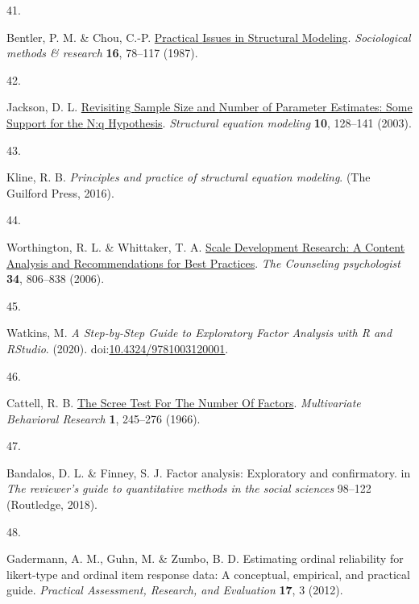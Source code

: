 \documentclass[
  man]{apa6}
\newlength{\cslhangindent}
\newlength{\csllabelwidth}
\newlength{\cslentryspacingunit} %
\newenvironment{CSLReferences}[2] %
 {%
  \setlength{\parindent}{0pt}
  \ifodd #1
  \let\oldpar\par
  \def\par{\hangindent=\cslhangindent\oldpar}
  \fi
  \setlength{\parskip}{#2\cslentryspacingunit}
 }%
 {}
\newcommand{\CSLLeftMargin}[1]{\parbox[t]{\csllabelwidth}{#1}}
\newcommand{\CSLRightInline}[1]{\parbox[t]{\linewidth - \csllabelwidth}{#1}\break}
\begin{document}
\begin{CSLReferences}{0}{0}
\leavevmode{}%
\CSLLeftMargin{41. }%
\CSLRightInline{Bentler, P. M. \& Chou, C.-P. \href{https://doi.org/10.1177/0049124187016001004}{Practical {Issues} in {Structural Modeling}}. \emph{Sociological methods \& research} \textbf{16}, 78--117 (1987).}

\leavevmode{}%
\CSLLeftMargin{42. }%
\CSLRightInline{Jackson, D. L. \href{https://doi.org/10.1207/S15328007SEM1001_6}{Revisiting {Sample Size} and {Number} of {Parameter Estimates}: {Some Support} for the {N}:q {Hypothesis}}. \emph{Structural equation modeling} \textbf{10}, 128--141 (2003).}

\leavevmode{}%
\CSLLeftMargin{43. }%
\CSLRightInline{Kline, R. B. \emph{Principles and practice of structural equation modeling}. ({The Guilford Press}, 2016).}

\leavevmode{}%
\CSLLeftMargin{44. }%
\CSLRightInline{Worthington, R. L. \& Whittaker, T. A. \href{https://doi.org/10.1177/0011000006288127}{Scale {Development Research}: {A Content Analysis} and {Recommendations} for {Best Practices}}. \emph{The Counseling psychologist} \textbf{34}, 806--838 (2006).}

\leavevmode{}%
\CSLLeftMargin{45. }%
\CSLRightInline{Watkins, M. \emph{A {Step}-by-{Step Guide} to {Exploratory Factor Analysis} with {R} and {RStudio}}. (2020). doi:\href{https://doi.org/10.4324/9781003120001}{10.4324/9781003120001}.}

\leavevmode{}%
\CSLLeftMargin{46. }%
\CSLRightInline{Cattell, R. B. \href{https://doi.org/10.1207/s15327906mbr0102_10}{The {Scree Test For The Number Of Factors}}. \emph{Multivariate Behavioral Research} \textbf{1}, 245--276 (1966).}

\leavevmode{}%
\CSLLeftMargin{47. }%
\CSLRightInline{Bandalos, D. L. \& Finney, S. J. Factor analysis: {Exploratory} and confirmatory. in \emph{The reviewer's guide to quantitative methods in the social sciences} 98--122 ({Routledge}, 2018).}

\leavevmode{}%
\CSLLeftMargin{48. }%
\CSLRightInline{Gadermann, A. M., Guhn, M. \& Zumbo, B. D. Estimating ordinal reliability for likert-type and ordinal item response data: A conceptual, empirical, and practical guide. \emph{Practical Assessment, Research, and Evaluation} \textbf{17}, 3 (2012).}


\end{CSLReferences}
\end{document}
